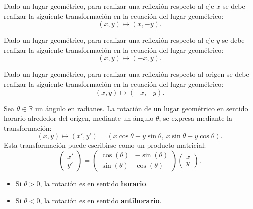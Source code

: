 \documentclass[a4,11pt]{aleph-notas}
\begin{document}
\begin{defi}
    Dado un lugar geométrico, para realizar una reflexión respecto al eje $x$ se debe realizar la siguiente transformación en la ecuación del lugar geométrico:
    \[
        (x,y)\mapsto (x,-y).
    \]
\end{defi}

\begin{defi}
    Dado un lugar geométrico, para realizar una reflexión respecto al eje $y$ se debe realizar la siguiente transformación en la ecuación del lugar geométrico:
    \[
        (x,y)\mapsto (-x,y).
    \]
\end{defi}

\begin{defi}
    Dado un lugar geométrico, para realizar una reflexión respecto al origen se debe realizar la siguiente transformación en la ecuación del lugar geométrico:
    \[
        (x,y)\mapsto (-x,-y).
    \]
\end{defi}

\begin{defi}
    Sea \( \theta \in \mathbb{R} \) un ángulo en radianes. La rotación de un lugar geométrico en sentido horario alrededor del origen, mediante un ángulo \( \theta \), se expresa mediante la transformación:
    \[
        (x, y) \mapsto (x', y') = (x\cos\theta - y\sin\theta,\ x\sin\theta + y\cos\theta).
    \]
    Esta transformación puede escribirse como un producto matricial:
    \[
        \begin{pmatrix}
        x' \\ y'
        \end{pmatrix}
        =
        \begin{pmatrix}
        \cos(\theta) & -\sin(\theta) \\
        \sin(\theta) & \cos(\theta)
        \end{pmatrix}
        \begin{pmatrix}
        x \\ y
        \end{pmatrix}.
    \]
\end{defi}

\begin{advertencia}
    \begin{itemize}
        \item Si \( \theta > 0 \), la rotación es en sentido \textbf{horario}.
        \item Si \( \theta < 0 \), la rotación es en sentido \textbf{antihorario}.
    \end{itemize}
\end{advertencia}
\end{document}

